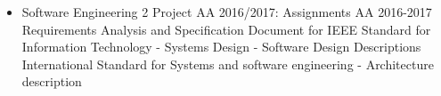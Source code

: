 \begin{itemize}
	\item Software Engineering 2 Project AA 2016/2017: Assignments AA 2016-2017
	  Requirements Analysis and Specification Document for \PowerEnJoy{}
	 IEEE Standard for Information Technology - Systems Design - Software Design Descriptions
	 International Standard for Systems and software engineering - Architecture description
\end{itemize}
